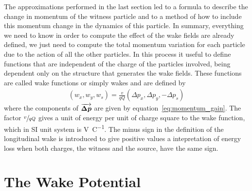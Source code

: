     The approximations performed in the last section led to a formula to describe the change in momentum of the witness particle and to a method of how to include this momentum change in the dynamics of this particle. In summary, everything we need to know in order to compute the effect of the wake fields are already defined, we just need to compute the total momentum variation for each particle due to the action of all the other particles. In this process it useful to define functions that are independent of the charge of the particles involved, being dependent only on the structure that generates the wake fields. These functions are called wake functions or simply wakes and are defined by
    \begin{align}\label{eq:wake_definition}
	  	\left(w_x, w_y, w_s\right) =
	  	\frac{v}{qQ} \left(\Delta p_x, \Delta p_y, -\Delta p_s\right)
    \end{align}
    where the components of $\overrightarrow{\boldsymbol{\Delta p}}$ are given by equation~\eqref{eq:momentum_gain}. The factor $\sfrac{v}{qQ}$ gives a unit of energy per unit of charge square to the wake function, which in SI unit system is \si{\volt\per\coulomb}.  The minus sign in the definition of the longitudinal wake is introduced to give positive values a intepretation of energy loss when both charges, the witness and the source, have the same sign.

\section{The Wake Potential}

